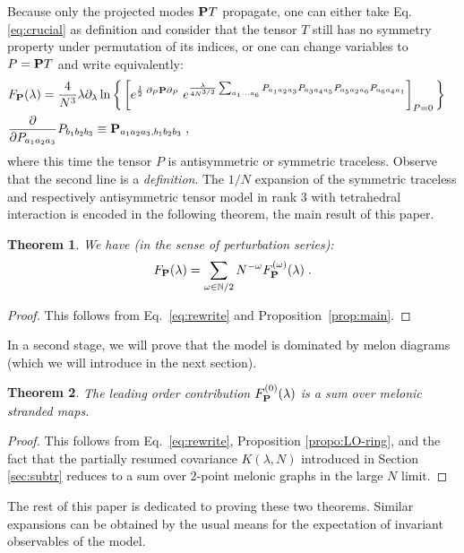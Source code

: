 \documentclass[10pt]{article}
\theoremstyle{plain}
\newtheorem{theorem}{Theorem}
\theoremstyle{definition}
\newcommand{\bP}{ {\bf P} }
\begin{document}
Because only the projected modes $\bP T$ propagate, one can either take Eq.\eqref{eq:crucial} as definition and consider that
the tensor $T$ still has no symmetry property under permutation of its indices, or one can change variables to $P = \bP T$ and write equivalently:
\begin{align}\label{eq:crucial1} 
&  F_{\bP}(\lambda)  = \frac{4}{N^3} \lambda\partial_{\lambda} \ln \bigg\{
     \left[ e^{\frac{1}{2} \;   \partial_P \bP \partial_P  }      \; e^{  \frac{  \lambda  }{4 N^{3/2}}   
 \sum_{a_1\dots a_6}  P_{a_1a_2a_3}   P_{a_3a_4a_5}    P_{a_5 a_2 a_6}  P_{a_6a_4 a_1} } \right]_{P=0}
  \bigg\} \crcr
& \frac{\partial}{\partial P_{a_1a_2a_3}} P_{b_1b_2b_3}  \equiv \bP_{a_1a_2a_3,b_1b_2b_3} \;,
\end{align}
where this time the tensor $P$ is antisymmetric or symmetric traceless. Observe that the second line is a \emph{definition}.
The $1/N$ expansion of the symmetric traceless and respectively antisymmetric tensor model in rank $3$ with tetrahedral interaction is encoded in the following theorem, the main result of this paper.
\begin{theorem}\label{thm:main}
We have (in the sense of perturbation series):
\[
 F_{\bP}(\lambda) = \sum_{\omega \in \mathbb{N}/2} N^{-\omega} F_{\bP}^{(\omega)} (\lambda) \;.
\]
\end{theorem}
\begin{proof}
 This follows from Eq.~\ref{eq:rewrite} and Proposition~\ref{prop:main}.
 
\end{proof}

In a second stage, we will prove that the model is dominated by melon diagrams (which we will introduce in the next section). 
\begin{theorem}\label{thm:LO}
The leading order contribution $F_{\bP}^{(0)} (\lambda)$ is a sum over melonic stranded maps. 
\end{theorem}
\begin{proof}
This follows from Eq.~\ref{eq:rewrite}, Proposition \ref{propo:LO-ring}, and the fact that the partially resumed covariance $K(\lambda,N)$ introduced in Section \ref{sec:subtr} reduces to a sum over $2$-point melonic graphs in the large $N$ limit.
\end{proof}

The rest of this paper is dedicated to proving these two theorems. Similar expansions can be obtained by the usual means for the expectation of invariant observables of the model.
\end{document}
